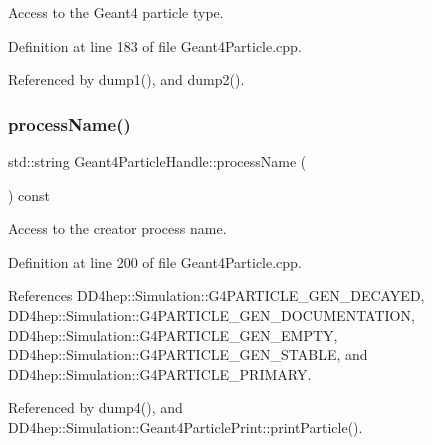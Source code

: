 Access to the Geant4 particle type. 



Definition at line 183 of file Geant4\+Particle.\+cpp.



Referenced by dump1(), and dump2().

\hypertarget{class_d_d4hep_1_1_simulation_1_1_geant4_particle_handle_a4b2857a4e17df287169d0635bea3f9f9}{}\label{class_d_d4hep_1_1_simulation_1_1_geant4_particle_handle_a4b2857a4e17df287169d0635bea3f9f9} 
\subsubsection{\texorpdfstring{process\+Name()}{processName()}}
{\footnotesize\ttfamily std\+::string Geant4\+Particle\+Handle\+::process\+Name (\begin{DoxyParamCaption}{ }\end{DoxyParamCaption}) const}



Access to the creator process name. 



Definition at line 200 of file Geant4\+Particle.\+cpp.



References D\+D4hep\+::\+Simulation\+::\+G4\+P\+A\+R\+T\+I\+C\+L\+E\+\_\+\+G\+E\+N\+\_\+\+D\+E\+C\+A\+Y\+ED, D\+D4hep\+::\+Simulation\+::\+G4\+P\+A\+R\+T\+I\+C\+L\+E\+\_\+\+G\+E\+N\+\_\+\+D\+O\+C\+U\+M\+E\+N\+T\+A\+T\+I\+ON, D\+D4hep\+::\+Simulation\+::\+G4\+P\+A\+R\+T\+I\+C\+L\+E\+\_\+\+G\+E\+N\+\_\+\+E\+M\+P\+TY, D\+D4hep\+::\+Simulation\+::\+G4\+P\+A\+R\+T\+I\+C\+L\+E\+\_\+\+G\+E\+N\+\_\+\+S\+T\+A\+B\+LE, and D\+D4hep\+::\+Simulation\+::\+G4\+P\+A\+R\+T\+I\+C\+L\+E\+\_\+\+P\+R\+I\+M\+A\+RY.



Referenced by dump4(), and D\+D4hep\+::\+Simulation\+::\+Geant4\+Particle\+Print\+::print\+Particle().

\hypertarget{class_d_d4hep_1_1_simulation_1_1_geant4_particle_handle_a3b3a0595817fe179c68030e6cac92f9b}{}\label{class_d_d4hep_1_1_simulation_1_1_geant4_particle_handle_a3b3a0595817fe179c68030e6cac92f9b} 
